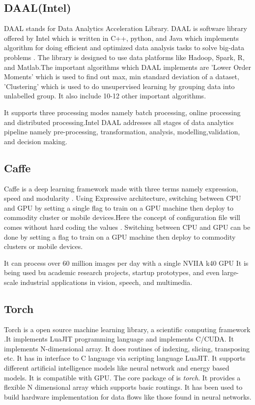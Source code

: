 \subsection{DAAL(Intel)}

    DAAL stands for Data Analytics Acceleration Library. DAAL is
    software library offered by Intel which is written in C++, python,
    and Java which implements algorithm for doing efficient and
    optimized data analysis tasks to solve big-data
    problems \cite{www-daal-wiki}. The library is designed to use
    data platforms like Hadoop, Spark, R, and Matlab.The important
    algorithms which DAAL implements are 'Lower Order Moments' which
    is used to find out max, min standard deviation of a dataset,
    'Clustering' which is used to do unsupervised learning by grouping
    data into unlabelled group. It also include 10-12 other important
    algorithms.

    \cite{www-daal-official} It supports three processing modes
    namely batch processing, online processing and distributed
    processing.Intel DAAL addresses all stages of data analytics
    pipeline namely pre-processing, transformation, analysis,
    modelling,validation, and decision making.
    
    
\subsection{Caffe}

    Caffe is a deep learning framework made with three terms namely
    expression, speed and modularity \cite{www-caffe}. Using
    Expressive architecture, switching between CPU and GPU by setting
    a single flag to train on a GPU machine then deploy to commodity
    cluster or mobile devices.Here the concept of configuration file
    will comes without hard coding the values . Switching between CPU
    and GPU can be done by setting a flag to train on a GPU machine
    then deploy to commodity clusters or mobile devices.

    It can process over 60 million images per day with a single NVIIA
    k40 GPU It is being used bu academic research projects, startup
    prototypes, and even large-scale industrial applications in
    vision, speech, and multimedia.
    
\subsection{Torch}

    Torch is a open source machine learning library, a scientific
    computing framework \cite{www-torch} .It implements LuaJIT
    programming language and implements C/CUDA. It implements
    N-dimensional array. It does routines of indexing, slicing,
    transposing etc. It has in interface to C language via scripting
    language LuaJIT. It supports different artificial intelligence
    models like neural network and energy based models. It is
    compatible with GPU.  The core package of is \textit{torch}. It provides
    a flexible N dimensional array which supports basic routings. It
    has been used to build hardware implementation for data flows like
    those found in neural networks.
    
